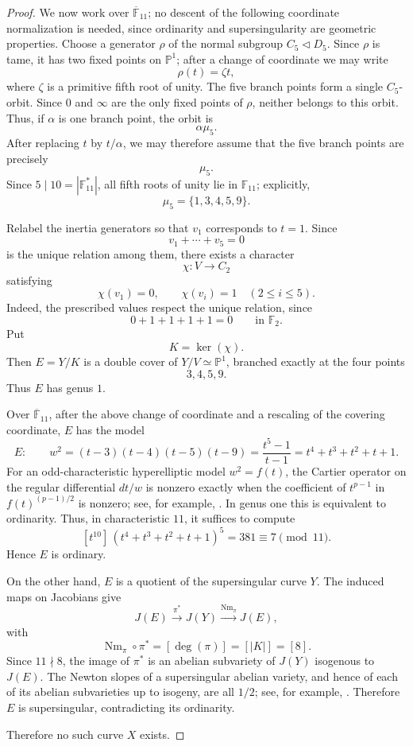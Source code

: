 \documentclass[11pt]{amsart}
\theoremstyle{remark}
\newcommand{\F}{\mathbb F}
\newcommand{\PP}{\mathbb P}
\begin{document}
\begin{proof}
We now work over $\overline{\F}_{11}$; no descent of the following
coordinate normalization is needed, since ordinarity and
supersingularity are geometric properties. Choose a generator $\rho$ of
the normal subgroup $C_5\triangleleft D_5$. Since $\rho$ is tame, it
has two fixed points on $\PP^1$; after a change of coordinate we may
write
\[
\rho(t)=\zeta t,
\]
where $\zeta$ is a primitive fifth root of unity. The five branch
points form a single $C_5$-orbit. Since $0$ and $\infty$ are the only
fixed points of $\rho$, neither belongs to this orbit. Thus, if
$\alpha$ is one branch point, the orbit is
\[
        \alpha\mu_5.
\]
After replacing $t$ by $t/\alpha$, we may therefore assume that the
five branch points are precisely
\[
\mu_5.
\]
Since $5\mid10=|\F_{11}^{*}|$, all fifth roots of unity lie in
$\F_{11}$; explicitly,
\[
\mu_5=\{1,3,4,5,9\}.
\]

Relabel the inertia generators so that $v_1$ corresponds to $t=1$.
Since
\[
v_1+\cdots+v_5=0
\]
is the unique relation among them, there exists a character
\[
\chi:V\longrightarrow C_2
\]
satisfying
\[
\chi(v_1)=0,\qquad
\chi(v_i)=1\quad(2\le i\le5).
\]
Indeed, the prescribed values respect the unique relation, since
\[
0+1+1+1+1=0
\qquad\text{in }\F_2.
\]
Put
\[
K=\ker(\chi).
\]
Then $E=Y/K$ is a double cover of $Y/V\simeq\PP^1$, branched exactly
at the four points
\[
3,4,5,9.
\]
Thus $E$ has genus $1$.

Over $\overline{\F}_{11}$, after the above change of coordinate and a
rescaling of the covering coordinate, $E$ has the model
\begin{equation}\label{eq:ellipticquotient}
E:\qquad
w^2=(t-3)(t-4)(t-5)(t-9)
=\frac{t^5-1}{t-1}
=t^4+t^3+t^2+t+1.
\end{equation}
For an odd-characteristic hyperelliptic model $w^2=f(t)$, the
Cartier operator on the regular differential $dt/w$ is nonzero exactly
when the coefficient of $t^{p-1}$ in $f(t)^{(p-1)/2}$ is nonzero; see,
for example, \cite[\S2]{Yui}. In genus one this is equivalent to
ordinarity. Thus, in characteristic
$11$, it suffices to compute
\[
[t^{10}]\,(t^4+t^3+t^2+t+1)^5
=
381
\equiv7\pmod{11}.
\]
Hence $E$ is ordinary.

On the other hand, $E$ is a quotient of the supersingular curve $Y$.
The induced maps on Jacobians give
\[
J(E)\xrightarrow{\pi^*}J(Y)
\xrightarrow{\operatorname{Nm}_\pi}J(E),
\]
with
\[
\operatorname{Nm}_\pi\circ\pi^*
=
[\deg(\pi)]
=
[|K|]
=
[8].
\]
Since $11\nmid8$, the image of $\pi^*$ is an abelian subvariety of
$J(Y)$ isogenous to $J(E)$. The Newton slopes of a supersingular
abelian variety, and hence of each of its abelian subvarieties up to
isogeny, are all $1/2$; see, for example, \cite[Chapter~I]{LiOort}.
Therefore $E$ is supersingular, contradicting its ordinarity.

Therefore no such curve $X$ exists.
\end{proof}
\end{document}
